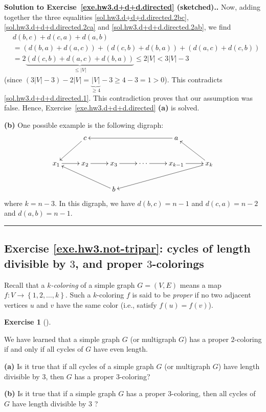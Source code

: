 \documentclass[numbers=enddot,12pt,final,onecolumn,notitlepage]{scrartcl}%
\newcounter{exer}
\theoremstyle{definition}
\newtheorem{exmp}[exer]{Exercise}
\newenvironment{exercise}[1][]
{\begin{exmp}[#1]\begin{leftbar}}
{\end{leftbar}\end{exmp}}
\newenvironment{proof}[1][Proof]{\noindent\textbf{#1.} }{\ \rule{0.5em}{0.5em}}
\newcommand{\set}[1]{\left\{ #1 \right\}}
\newcommand{\abs}[1]{\left| #1 \right|}
\newcommand{\tup}[1]{\left( #1 \right)}
\begin{document}
\begin{proof}[Solution to Exercise~\ref{exe.hw3.d+d+d.directed}
(sketched).]
Now, adding together the three equalities
\eqref{sol.hw3.d+d+d.directed.2bc},
\eqref{sol.hw3.d+d+d.directed.2ca} and
\eqref{sol.hw3.d+d+d.directed.2ab}, we find
\begin{align*}
& d \tup{b, c} + d \tup{c, a} + d \tup{a, b} \\
&= \tup{d \tup{b, a} + d \tup{a, c}}
    + \tup{d \tup{c, b} + d \tup{b, a}}
    + \tup{d \tup{a, c} + d \tup{c, b}} \\
&= 2 \underbrace{\tup{d \tup{c, b} + d \tup{a, c} + d \tup{b, a}}}_{\leq \abs{V}}
\leq 2 \abs{V} < 3 \abs{V} - 3
\end{align*}
(since $\tup{3 \abs{V} - 3} - 2 \abs{V}
= \underbrace{\abs{V}}_{\geq 4} - 3 \geq 4 - 3 = 1 > 0$).
This contradicts \eqref{sol.hw3.d+d+d.directed.1}.
This contradiction proves that our assumption was false.
Hence, Exercise~\ref{exe.hw3.d+d+d.directed} \textbf{(a)} is solved.

\textbf{(b)} One possible example is the following digraph:
\[
\xymatrix{
& c \ar[ld] & & & a \ar[lll] \\
x_1 \ar[r] & x_2 \ar[r] & x_3 \ar[r] & \cdots \ar[r] & x_{k-1} \ar[r] & x_k \ar[lu] \ar[llld] \\
& & b \ar[llu]
}
\]
where $k = n-3$.
In this digraph, we have $d \tup{b, c} = n - 1$ and
$d \tup{c, a} = n - 2$ and $d \tup{a, b} = n - 1$.
\end{proof}

\subsection{Exercise \ref{exe.hw3.not-tripar}: cycles of length
divisible by $3$, and proper $3$-colorings}

Recall that a \textit{$k$-coloring} of a simple graph $G = \tup{V, E}$
means a map $f : V \to \set{1, 2, \ldots, k}$. Such a $k$-coloring $f$
is said to be \textit{proper} if no two adjacent vertices $u$ and $v$
have the same color (i.e., satisfy $f \tup{u} = f \tup{v}$).

\begin{exercise} \label{exe.hw3.not-tripar}
We have learned that a simple graph $G$ (or multigraph $G$)
has a proper $2$-coloring if
and only if all cycles of $G$ have even length.

\textbf{(a)} Is it true that if all cycles of a simple graph $G$ (or
multigraph $G$) have length divisible by $3$, then $G$ has a proper
$3$-coloring?

\textbf{(b)} Is it true that if a simple graph $G$ has a proper
$3$-coloring, then all cycles of $G$ have length divisible by $3$ ?
\end{exercise}
\end{document}
